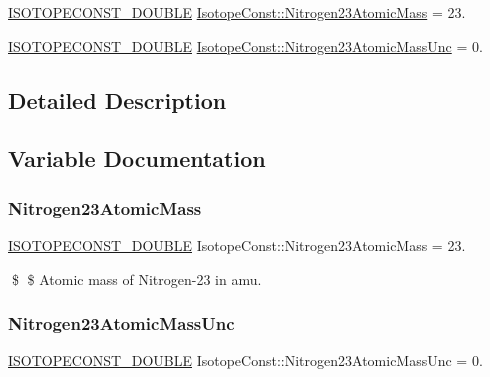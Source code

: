 \begin{DoxyCompactItemize}
\item 
\mbox{\hyperlink{group___isotope_const-_macros_ga8f45a7272ce02c0b4c65c44636ed719a}{I\+S\+O\+T\+O\+P\+E\+C\+O\+N\+S\+T\+\_\+\+D\+O\+U\+B\+LE}} \mbox{\hyperlink{group___isotope_const-_nitrogen-_n23_ga8a60c47e7aeac594deb8b27a20be3f95}{Isotope\+Const\+::\+Nitrogen23\+Atomic\+Mass}} = 23.
\item 
\mbox{\hyperlink{group___isotope_const-_macros_ga8f45a7272ce02c0b4c65c44636ed719a}{I\+S\+O\+T\+O\+P\+E\+C\+O\+N\+S\+T\+\_\+\+D\+O\+U\+B\+LE}} \mbox{\hyperlink{group___isotope_const-_nitrogen-_n23_gab3094e22a611aacfa93ab7aa874270c5}{Isotope\+Const\+::\+Nitrogen23\+Atomic\+Mass\+Unc}} = 0.
\end{DoxyCompactItemize}


\subsection{Detailed Description}


\subsection{Variable Documentation}
\mbox{\label{group___isotope_const-_nitrogen-_n23_ga8a60c47e7aeac594deb8b27a20be3f95}} 
\subsubsection{\texorpdfstring{Nitrogen23\+Atomic\+Mass}{Nitrogen23AtomicMass}}
{\footnotesize\ttfamily \mbox{\hyperlink{group___isotope_const-_macros_ga8f45a7272ce02c0b4c65c44636ed719a}{I\+S\+O\+T\+O\+P\+E\+C\+O\+N\+S\+T\+\_\+\+D\+O\+U\+B\+LE}} Isotope\+Const\+::\+Nitrogen23\+Atomic\+Mass = 23.}

\$ \$ Atomic mass of Nitrogen-\/23 in amu. \mbox{\label{group___isotope_const-_nitrogen-_n23_gab3094e22a611aacfa93ab7aa874270c5}} 
\subsubsection{\texorpdfstring{Nitrogen23\+Atomic\+Mass\+Unc}{Nitrogen23AtomicMassUnc}}
{\footnotesize\ttfamily \mbox{\hyperlink{group___isotope_const-_macros_ga8f45a7272ce02c0b4c65c44636ed719a}{I\+S\+O\+T\+O\+P\+E\+C\+O\+N\+S\+T\+\_\+\+D\+O\+U\+B\+LE}} Isotope\+Const\+::\+Nitrogen23\+Atomic\+Mass\+Unc = 0.}

